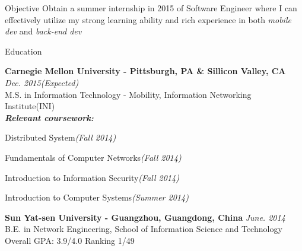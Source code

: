 \documentclass{resume} %
\begin{document}
\begin{rSection}{Objective}
Obtain a summer internship in 2015 of Software Engineer where I can effectively utilize my strong learning ability and rich experience in both \textit{mobile dev} and \textit{back-end dev}

\end{rSection}


\begin{rSection}{Education}

{\bf Carnegie Mellon University - Pittsburgh, PA \& Sillicon Valley, CA} \hfill {\em Dec. 2015(Expected)} \\ 
M.S. in Information Technology - Mobility, Information Networking Institute(INI) \\
{\bf\em Relevant coursework:}
\begin{inparaenum}[\itshape 1\upshape)]
\item Distributed System{\em(Fall 2014)}
\item Fundamentals of Computer Networks{\em(Fall 2014)}
\item Introduction to Information Security{\em(Fall 2014)}
\item Introduction to Computer Systems{\em(Summer 2014)}
\end{inparaenum}


{\bf Sun Yat-sen University - Guangzhou, Guangdong, China} \hfill {\em June. 2014} \\ 
B.E. in Network Engineering, 
School of Information Science and Technology \\
Overall GPA: 3.9/4.0 Ranking 1/49

\end{rSection}


\end{document}
